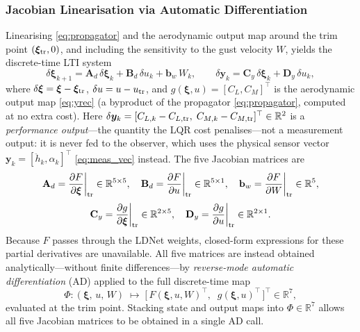 \documentclass[11pt,a4paper]{article}
\newcommand{\vxi}{\bm{\xi}}
\newcommand{\vy}{\bm{y}}
\newcommand{\mA}{\mathbf{A}}
\newcommand{\mB}{\mathbf{B}}
\newcommand{\mC}{\mathbf{C}}
\newcommand{\mD}{\mathbf{D}}
\begin{document}
\subsubsection{Jacobian Linearisation via Automatic Differentiation}
\label{sec:jacobian}

Linearising \eqref{eq:propagator} and the aerodynamic output map around the
trim point $(\vxi_{\rm tr}, 0)$, and including the sensitivity to the gust
velocity $W$, yields the discrete-time LTI system
\begin{equation}
  \delta\vxi_{k+1} = \mA_d\,\delta\vxi_k + \mB_d\,\delta u_k + \mathbf{b}_w\,W_k,
  \qquad
  \delta\vy_k = \mC_y\,\delta\vxi_k + \mD_y\,\delta u_k,
  \label{eq:lti}
\end{equation}
where $\delta\vxi = \vxi - \vxi_{\rm tr}$, $\delta u = u - u_{\rm tr}$,
and $g(\vxi, u) = [C_L, C_M]^\top$ is the aerodynamic output map \eqref{eq:yrec}
(a byproduct of the propagator \eqref{eq:propagator}, computed at no extra cost).
Here $\delta\vy_k = [C_{L,k} - C_{L,\rm tr},\; C_{M,k} - C_{M,\rm tr}]^\top
\in \mathbb{R}^2$ is a \emph{performance output}---the quantity the LQR cost
penalises---not a measurement output: it is never fed to the observer, which
uses the physical sensor vector $\mathbf{y}_k = [\ddot{h}_k, \alpha_k]^\top$
\eqref{eq:meas_vec} instead.
The five Jacobian matrices are
\begin{equation}
  \mA_d = \frac{\partial F}{\partial \vxi}\bigg|_{\rm tr} \in \mathbb{R}^{5\times5},\quad
  \mB_d = \frac{\partial F}{\partial u}\bigg|_{\rm tr} \in \mathbb{R}^{5\times1},\quad
  \mathbf{b}_w = \frac{\partial F}{\partial W}\bigg|_{\rm tr} \in \mathbb{R}^{5},
  \label{eq:jacobians}
\end{equation}
\begin{equation}
  \mC_y = \frac{\partial g}{\partial \vxi}\bigg|_{\rm tr} \in \mathbb{R}^{2\times5},\quad
  \mD_y = \frac{\partial g}{\partial u}\bigg|_{\rm tr} \in \mathbb{R}^{2\times1}.
  \label{eq:jacobians_out}
\end{equation}
Because $F$ passes through the LDNet weights, closed-form expressions for these
partial derivatives are unavailable.
All five matrices are instead obtained analytically---without finite
differences---by \emph{reverse-mode automatic differentiation} (AD) applied to
the full discrete-time map
\begin{equation}
  \Phi : (\vxi,\, u,\, W) \;\longmapsto\;
  \bigl[\,F(\vxi, u, W)^\top,\;\; g(\vxi, u)^\top\,\bigr]^\top
  \in \mathbb{R}^{7},
  \label{eq:Phi}
\end{equation}
evaluated at the trim point.
Stacking state and output maps into $\Phi \in \mathbb{R}^7$ allows all five
Jacobian matrices to be obtained in a single AD call.
\end{document}
